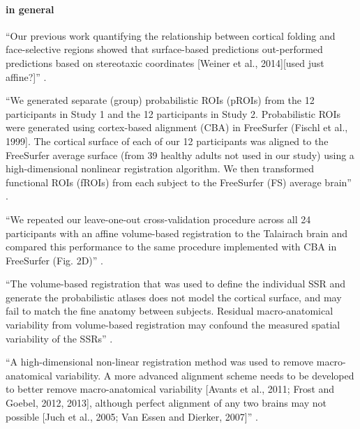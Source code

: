 \paragraph{in general}




``Our previous work quantifying the relationship between cortical folding and
face-selective regions showed that surface-based predictions out-performed
predictions based on stereotaxic coordinates [Weiner et al., 2014][used just
affine?]'' \citep{weiner2018defining}.

``We generated separate (group) probabilistic ROIs (pROIs) from the 12
participants in Study 1 and the 12 participants in Study 2.
%
Probabilistic ROIs were generated using cortex-based alignment (CBA) in
FreeSurfer (Fischl et al., 1999].
%
The cortical surface of each of our 12 participants was aligned to the
FreeSurfer average surface (from 39 healthy adults not used in our study) using
a high-dimensional nonlinear registration algorithm.
%
We then transformed functional ROIs (fROIs) from each subject to the FreeSurfer
(FS) average brain'' \citep{weiner2018defining}.


``We repeated our leave-one-out cross-validation procedure across all 24
participants with an affine volume-based registration to the Talairach brain and
compared this performance to the same procedure implemented with CBA in
FreeSurfer (Fig. 2D)'' \citep{weiner2018defining}.


``The volume-based registration that was used to define the individual SSR and
generate the probabilistic atlases does not model the cortical surface,
and may fail to match the fine anatomy between subjects.
%
Residual macro-anatomical variability from volume-based registration may
confound the measured spatial variability of the SSRs''
\citep{zhen2017quantifying}.


``A high-dimensional non-linear registration method was used to remove
macro-anatomical variability.
%
A more advanced alignment scheme needs to be developed to better remove
macro-anatomical variability [Avants et al., 2011; Frost and Goebel, 2012,
2013], although perfect alignment of any two brains may not possible [Juch et
al., 2005; Van Essen and Dierker, 2007]'' \citep{zhen2015quantifying}.


